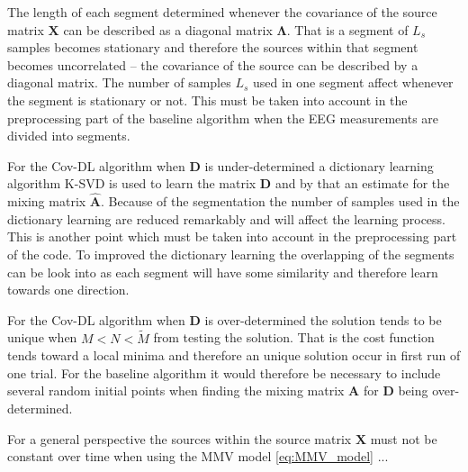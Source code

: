 The length of each segment determined whenever the covariance of the source matrix $\mathbf{X}$ can be described as a diagonal matrix $\boldsymbol{\Lambda}$. That is a segment of $L_s$ samples becomes stationary and therefore the sources within that segment becomes uncorrelated -- the covariance of the source can be described by a diagonal matrix. The number of samples $L_s$ used in one segment affect whenever the segment is stationary or not. This must be taken into account in the preprocessing part of the baseline algorithm when the EEG measurements are divided into segments.

For the Cov-DL algorithm when $\mathbf{D}$ is under-determined a dictionary learning algorithm K-SVD is used to learn the matrix $\mathbf{D}$ and by that an estimate for the mixing matrix $\hat{\mathbf{A}}$. Because of the segmentation the number of samples used in the dictionary learning are reduced remarkably and will affect the learning process. This is another point which must be taken into account in the preprocessing part of the code. To improved the dictionary learning the overlapping of the segments can be look into as each segment will have some similarity and therefore learn towards one direction.

For the Cov-DL algorithm when $\mathbf{D}$ is over-determined the solution tends to be unique when $M < N < \widetilde{M}$ from testing the solution. That is the cost function tends toward a local minima and therefore an unique solution occur in first run of one trial. For the baseline algorithm it would therefore be necessary to include several random initial points when finding the mixing matrix $\mathbf{A}$ for $\mathbf{D}$ being over-determined.

For a general perspective the sources within the source matrix $\mathbf{X}$ must not be constant over time when using the MMV model \eqref{eq:MMV_model} ...